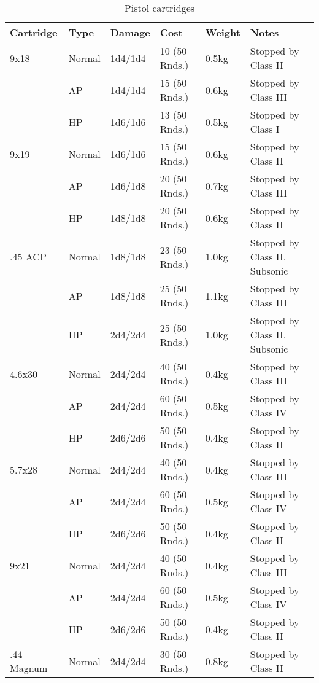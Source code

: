 \begin{table}
  \caption{Pistol cartridges}
  \label{tab:PistolCartridges}
  \begin{center}
    \begin{tabular}{| l | l | l | l | l | l |}
      \hline
      \textbf{Cartridge}  & \textbf{Type}   & \textbf{Damage} &
      \textbf{Cost} & \textbf{Weight} & \textbf{Notes} \\ \hline

      9x18    & Normal & 1d4/1d4  & 10 (50 Rnds.) & 0.5kg & Stopped by Class II \\ \hline
      \,      & AP     & 1d4/1d4  & 15 (50 Rnds.) & 0.6kg & Stopped by Class III \\ \hline
      \,      & HP     & 1d6/1d6  & 13 (50 Rnds.) & 0.5kg & Stopped by Class I \\ \hline
      9x19    & Normal & 1d6/1d6  & 15 (50 Rnds.) & 0.6kg & Stopped by Class II \\ \hline
      \,      & AP     & 1d6/1d8  & 20 (50 Rnds.) & 0.7kg & Stopped by Class III \\ \hline
      \,      & HP     & 1d8/1d8  & 20 (50 Rnds.) & 0.6kg & Stopped by Class II \\ \hline
      .45 ACP & Normal & 1d8/1d8  & 23 (50 Rnds.) & 1.0kg & Stopped by Class II, Subsonic \\ \hline
      \,      & AP     & 1d8/1d8  & 25 (50 Rnds.) & 1.1kg & Stopped by Class III \\ \hline
      \,      & HP     & 2d4/2d4  & 25 (50 Rnds.) & 1.0kg & Stopped by Class II, Subsonic \\ \hline
      4.6x30  & Normal & 2d4/2d4  & 40 (50 Rnds.) & 0.4kg & Stopped by Class III \\ \hline
      \,      & AP     & 2d4/2d4  & 60 (50 Rnds.) & 0.5kg & Stopped by Class IV \\ \hline
      \,      & HP     & 2d6/2d6  & 50 (50 Rnds.) & 0.4kg & Stopped by Class II \\ \hline
      5.7x28  & Normal & 2d4/2d4  & 40 (50 Rnds.) & 0.4kg & Stopped by Class III \\ \hline
      \,      & AP     & 2d4/2d4  & 60 (50 Rnds.) & 0.5kg & Stopped by Class IV \\ \hline
      \,      & HP     & 2d6/2d6  & 50 (50 Rnds.) & 0.4kg & Stopped by Class II \\ \hline
      9x21    & Normal & 2d4/2d4  & 40 (50 Rnds.) & 0.4kg & Stopped by Class III \\ \hline
      \,      & AP     & 2d4/2d4  & 60 (50 Rnds.) & 0.5kg & Stopped by Class IV \\ \hline
      \,      & HP     & 2d6/2d6  & 50 (50 Rnds.) & 0.4kg & Stopped by Class II \\ \hline
      .44 Magnum & Normal & 2d4/2d4  & 30 (50 Rnds.) & 0.8kg & Stopped by Class II \\ \hline

    \end{tabular}
  \end{center}
\end{table}

